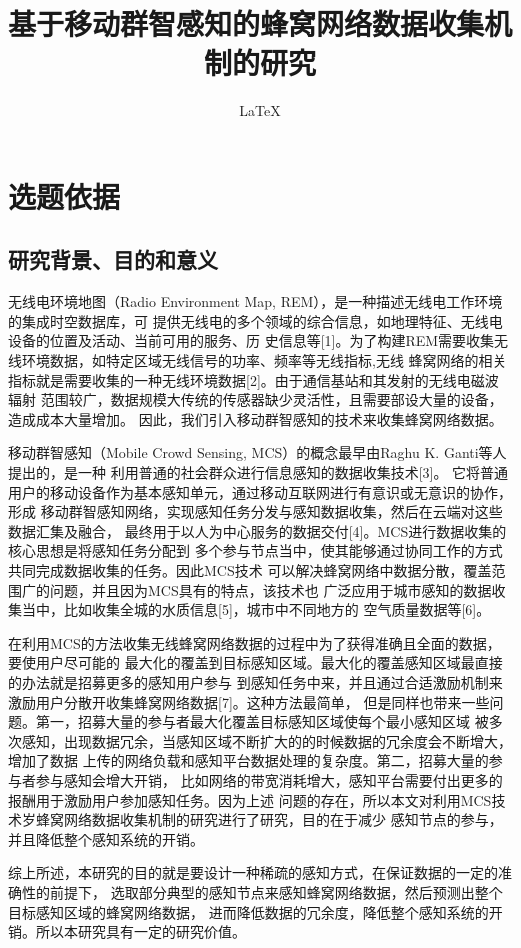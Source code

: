 \documentclass[UTF8]{ctexart}
\title{基于移动群智感知的蜂窝网络数据收集机制的研究}
\author{\LaTeX}
\begin{document}
\maketitle
\section{选题依据}
\subsection{研究背景、目的和意义}
无线电环境地图（Radio Environment Map, REM），是一种描述无线电工作环境的集成时空数据库，可
提供无线电的多个领域的综合信息，如地理特征、无线电设备的位置及活动、当前可用的服务、历
史信息等[1]。为了构建REM需要收集无线环境数据，如特定区域无线信号的功率、频率等无线指标,无线
蜂窝网络的相关指标就是需要收集的一种无线环境数据[2]。由于通信基站和其发射的无线电磁波辐射
范围较广，数据规模大传统的传感器缺少灵活性，且需要部设大量的设备，造成成本大量增加。
因此，我们引入移动群智感知的技术来收集蜂窝网络数据。

移动群智感知（Mobile Crowd Sensing, MCS）的概念最早由Raghu K. Ganti等人提出的，是一种
利用普通的社会群众进行信息感知的数据收集技术[3]。
它将普通用户的移动设备作为基本感知单元，通过移动互联网进行有意识或无意识的协作，形成
移动群智感知网络，实现感知任务分发与感知数据收集，然后在云端对这些数据汇集及融合，
最终用于以人为中心服务的数据交付[4]。MCS进行数据收集的核心思想是将感知任务分配到
多个参与节点当中，使其能够通过协同工作的方式共同完成数据收集的任务。因此MCS技术
可以解决蜂窝网络中数据分散，覆盖范围广的问题，并且因为MCS具有的特点，该技术也
广泛应用于城市感知的数据收集当中，比如收集全城的水质信息[5]，城市中不同地方的
空气质量数据等[6]。

在利用MCS的方法收集无线蜂窝网络数据的过程中为了获得准确且全面的数据，要使用户尽可能的
最大化的覆盖到目标感知区域。最大化的覆盖感知区域最直接的办法就是招募更多的感知用户参与
到感知任务中来，并且通过合适激励机制来激励用户分散开收集蜂窝网络数据[7]。这种方法最简单，
但是同样也带来一些问题。第一，招募大量的参与者最大化覆盖目标感知区域使每个最小感知区域
被多次感知，出现数据冗余，当感知区域不断扩大的的时候数据的冗余度会不断增大，增加了数据
上传的网络负载和感知平台数据处理的复杂度。第二，招募大量的参与者参与感知会增大开销，
比如网络的带宽消耗增大，感知平台需要付出更多的报酬用于激励用户参加感知任务。因为上述
问题的存在，所以本文对利用MCS技术岁蜂窝网络数据收集机制的研究进行了研究，目的在于减少
感知节点的参与，并且降低整个感知系统的开销。

综上所述，本研究的目的就是要设计一种稀疏的感知方式，在保证数据的一定的准确性的前提下，
选取部分典型的感知节点来感知蜂窝网络数据，然后预测出整个目标感知区域的蜂窝网络数据，
进而降低数据的冗余度，降低整个感知系统的开销。所以本研究具有一定的研究价值。
\end{document}
